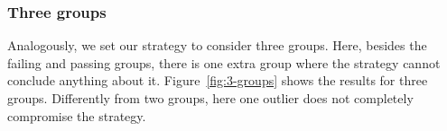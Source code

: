 \subsubsection{Three groups}

Analogously, we set our strategy to consider three groups. Here, besides the failing and passing groups, there is one extra group where the strategy cannot conclude anything about it. Figure~\ref{fig:3-groups} shows the results for three groups. Differently from two groups, here one outlier does not completely compromise the strategy.

\begin{figure}[ht]
     \begin{center}
\end{center}
\end{figure}
